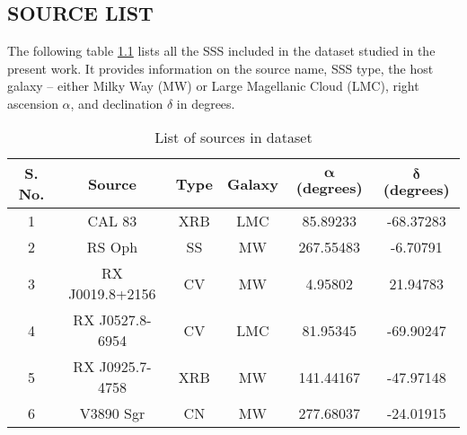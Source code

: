 \def\baselinestretch{1}
\chapter{\MakeUppercase{\ChapterTitleSix}} \label{chap:results}
    \minitoc
    
    
    \setcounter{footnote}{\value{footnotecount}}
    
    \newpage
    \section{\MakeUppercase{Source list}} \label{results:source-list}
    	The following table \ref{tab:source-list} lists all the SSS included in the dataset studied in the present work. It provides information on the source name, SSS type, the host galaxy -- either Milky Way (MW) or Large Magellanic Cloud (LMC), right ascension $\alpha$, and declination $\delta$ in degrees.
    	
    	\renewcommand{\arraystretch}{1.5}
    	\begin{table}[!htb]
    		\centering
    		\caption{List of sources in dataset}
    		\label{tab:source-list}
			\begin{tabular}{cccccc}
			\hline
			\textbf{S. No.} & \textbf{Source} & \textbf{Type} & \textbf{Galaxy} & {$\boldsymbol{\alpha}$ \textbf{(degrees)}} & {$\boldsymbol{\delta}$ \textbf{(degrees)}} \\ \hline
			{1} & {CAL 83} & {XRB} & {LMC} & {85.89233} & {-68.37283} \\
			{2} & {RS Oph} & {SS} & {MW} & {267.55483} & {-6.70791} \\
			{3} & {RX J0019.8+2156} & {CV} & {MW} & {4.95802} & {21.94783} \\
			{4} & {RX J0527.8-6954} & {CV} & {LMC} & {81.95345} & {-69.90247} \\
			{5} & {RX J0925.7-4758} & {XRB} & {MW} & {141.44167} & {-47.97148} \\
			{6} & {V3890 Sgr} & {CN} & {MW} & {277.68037} & {-24.01915} \\ \hline
			\end{tabular}
		\end{table}
		\renewcommand{\arraystretch}{2.2}
		
